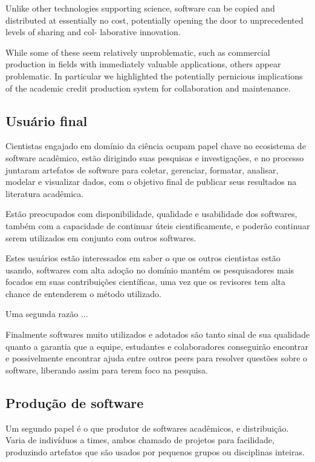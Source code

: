 Unlike other technologies supporting science, software can
be copied and distributed at essentially no cost, potentially
opening the door to unprecedented levels of sharing and col-
laborative innovation. \cite{howison2011scientific}

While some of these seem relatively unproblematic, such as commercial
production in fields with immediately valuable applications, others appear
problematic. In particular we highlighted the potentially pernicious
implications of the academic credit production system for collaboration and
maintenance.

\subsection{Usuário final}

Cientistas engajado em domínio da ciência ocupam papel chave no ecosistema de
software acadêmico, estão dirigindo suas pesquisas e investigações, e no
processo juntaram artefatos de software para coletar, gerenciar, formatar,
analisar, modelar e visualizar dados, com o objetivo final de publicar seus
resultados na literatura acadêmica.

Estão preocupados com disponibilidade, qualidade e usabilidade dos softwares,
também com a capacidade de continuar úteis cientificamente, e poderão continuar
serem utilizados em conjunto com outros softwares.

Estes usuários estão interessados em saber o que os outros cientistas estão
usando, softwares com alta adoção no domínio mantém os pesquisadores mais
focados em suas contribuições científicas, uma vez que os revisores tem alta
chance de entenderem o método utilizado.

Uma segunda razão ...

Finalmente softwares muito utilizados e adotados são tanto sinal de sua qualidade
quanto a garantia que a equipe, estudantes e colaboradores conseguirão encontrar
e possivelmente encontrar ajuda entre outros peers para resolver questões sobre o
software, liberando assim para terem foco na pesquisa.

\subsection{Produção de software}

Um segundo papel é o que produtor de softwares acadêmicos, e distribuição. Varia
de indivíduos a times, ambos chamado de projetos para facilidade, produzindo
artefatos que são usados por pequenos grupos ou disciplinas inteiras.

